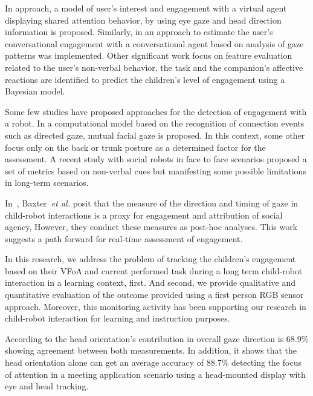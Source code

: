 \documentclass{sig-alternate}
\newcommand{\etal}{\textit{et al.}\xspace}
\begin{document}
In \cite{peters2010investigating} approach, a model of user's interest and
engagement with a virtual agent displaying shared attention behavior, by using
eye gaze and head direction information is proposed. Similarly, in
\cite{nakano2010estimating} an approach to estimate the user's conversational
engagement with a conversational agent based on analysis of gaze patterns was
implemented. Other significant work \cite{Castellano:2009} focus on feature
evaluation related to the user's non-verbal behavior, the task and the
companion's affective reactions are identified to predict the children's level
of engagement using a Bayesian model.

Some few studies have proposed approaches for the detection of engagement with a
robot. In \cite{Rich:2010} a computational model based on the recognition of
connection events such as directed gaze, mutual facial gaze is proposed. In this
context, some other \cite{Sanghvi:2011} focus only on the back or trunk posture
as a determined factor for the assessment. A recent study \cite{anzalone} with
social robots in face to face scenarios proposed a set of metrics based on
non-verbal cues but manifesting some possible limitations in long-term
scenarios.

In~\cite{baxter2014tracking}, Baxter~\etal posit that the measure of the
direction and timing of gaze in child-robot interactions is a proxy for
engagement and attribution of social agency, However, they conduct these
measures as post-hoc analyses. This work suggests a path forward for real-time
assessment of engagement.

In this research, we address the problem of tracking the children's engagement
based on their VFoA and current performed task during a long term child-robot
interaction in a learning context, first. And second, we provide qualitative and
quantitative evaluation of the outcome provided using a first person RGB sensor
approach. Moreover, this monitoring activity has been supporting our research in
child-robot interaction for learning and instruction purposes.


According to \cite{stiefelhagen2002tracking} the head orientation's contribution
in overall gaze direction is 68.9\% showing agreement between both measurements.
In addition, it shows that the head orientation alone can get an average
accuracy of 88.7\% detecting the focus of attention in a meeting application
scenario using a head-mounted display with eye and head tracking.
\end{document}
